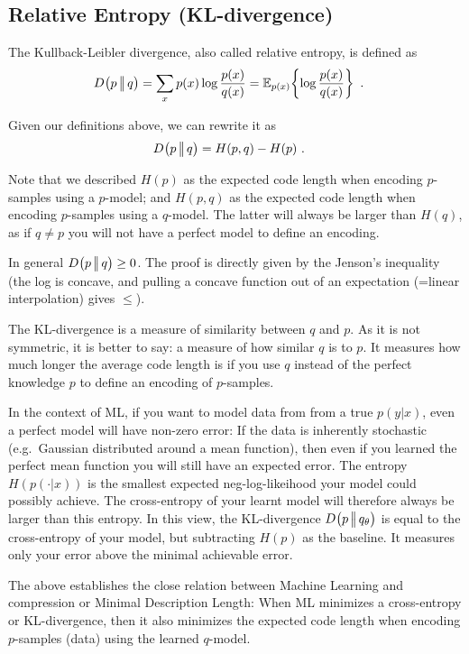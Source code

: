 \subsection{Relative Entropy (KL-divergence)}

The Kullback-Leibler divergence, also called relative entropy, is defined as
\begin{align}
\kld{p}{q}
&= \sum_x p(x) \log\frac{p(x)}{q(x)}
 = \Exp[p(x)]{\log\frac{p(x)}{q(x)}} ~.
\end{align}

Given our definitions above, we can rewrite it as
\begin{align}
\kld{p}{q}
&= H(p, q) - H(p) ~.
\end{align}

Note that we described $H(p)$ as the expected code length when encoding $p$-samples using a $p$-model; and $H(p, q)$ as the expected code length when encoding $p$-samples using a $q$-model. The latter will always be larger than $H(q)$, as if $q\not= p$ you will not have a perfect model to define an encoding.

In general $\kld{p}{q} \ge 0$. The proof is directly given by the Jenson's inequality (the log is concave, and pulling a concave function out of an expectation (=linear interpolation) gives $\le$).
 
The KL-divergence is a measure of similarity between $q$ and $p$. As it is not symmetric, it is better to say: a measure of how similar $q$ is to $p$. It measures how much longer the average code length is if you use $q$ instead of the perfect knowledge $p$ to define an encoding of $p$-samples.

In the context of ML, if you want to model data from from a true
$p(y|x)$, even a perfect model will have non-zero error: If the data
is inherently stochastic (e.g.\ Gaussian distributed around a mean
function), then even if you learned the perfect mean function you will
still have an expected error. The entropy $H(p(\cdot|x))$ is the
smallest expected neg-log-likeihood your model could possibly
achieve. The cross-entropy of your learnt model will therefore always
be larger than this entropy. In this view, the KL-divergence $\kld{p}{q_\t}$ is equal to the cross-entropy of your model, but subtracting $H(p)$ as the baseline. It measures only your error above the minimal achievable error.

The above establishes the close relation between Machine Learning and
compression or Minimal Description Length: When ML minimizes a
cross-entropy or KL-divergence, then it also minimizes the expected
code length when encoding $p$-samples (data) using the learned
$q$-model.


